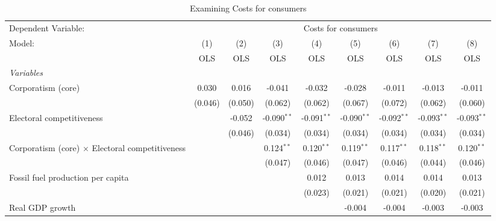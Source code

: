 
\begin{table}[htbp]
   \caption{Examining Costs for consumers}
   \centering
   \begin{tabular}{lcccccccc}
      \toprule
      Dependent Variable: & \multicolumn{8}{c}{Costs for consumers}\\
      Model:                                                 & (1)     & (2)     & (3)           & (4)           & (5)           & (6)           & (7)           & (8)\\  
                                                             &  OLS    & OLS     & OLS           & OLS           & OLS           & OLS           & OLS           & OLS\\  
      \midrule
      \emph{Variables}\\
      Corporatism (core)                                     & 0.030   & 0.016   & -0.041        & -0.032        & -0.028        & -0.011        & -0.013        & -0.011\\   
                                                             & (0.046) & (0.050) & (0.062)       & (0.062)       & (0.067)       & (0.072)       & (0.062)       & (0.060)\\   
      Electoral competitiveness                              &         & -0.052  & -0.090$^{**}$ & -0.091$^{**}$ & -0.090$^{**}$ & -0.092$^{**}$ & -0.093$^{**}$ & -0.093$^{**}$\\   
                                                             &         & (0.046) & (0.034)       & (0.034)       & (0.034)       & (0.034)       & (0.034)       & (0.034)\\   
      Corporatism (core) $\times$ Electoral competitiveness  &         &         & 0.124$^{**}$  & 0.120$^{**}$  & 0.119$^{**}$  & 0.117$^{**}$  & 0.118$^{**}$  & 0.120$^{**}$\\   
                                                             &         &         & (0.047)       & (0.046)       & (0.047)       & (0.046)       & (0.044)       & (0.046)\\   
      Fossil fuel production per capita                      &         &         &               & 0.012         & 0.013         & 0.014         & 0.014         & 0.013\\   
                                                             &         &         &               & (0.023)       & (0.021)       & (0.021)       & (0.020)       & (0.021)\\   
      Real GDP growth                                        &         &         &               &               & -0.004        & -0.004        & -0.003        & -0.003\\   

\end{tabular}
\end{table}

